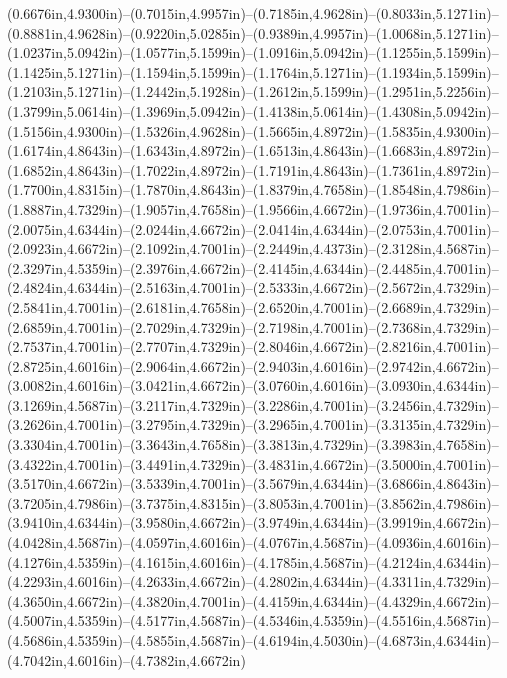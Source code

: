 (0.6676in,4.9300in)--(0.7015in,4.9957in)--(0.7185in,4.9628in)--(0.8033in,5.1271in)--(0.8881in,4.9628in)--(0.9220in,5.0285in)--(0.9389in,4.9957in)--(1.0068in,5.1271in)--(1.0237in,5.0942in)--(1.0577in,5.1599in)--(1.0916in,5.0942in)--(1.1255in,5.1599in)--(1.1425in,5.1271in)--(1.1594in,5.1599in)--(1.1764in,5.1271in)--(1.1934in,5.1599in)--(1.2103in,5.1271in)--(1.2442in,5.1928in)--(1.2612in,5.1599in)--(1.2951in,5.2256in)--(1.3799in,5.0614in)--(1.3969in,5.0942in)--(1.4138in,5.0614in)--(1.4308in,5.0942in)--(1.5156in,4.9300in)--(1.5326in,4.9628in)--(1.5665in,4.8972in)--(1.5835in,4.9300in)--(1.6174in,4.8643in)--(1.6343in,4.8972in)--(1.6513in,4.8643in)--(1.6683in,4.8972in)--(1.6852in,4.8643in)--(1.7022in,4.8972in)--(1.7191in,4.8643in)--(1.7361in,4.8972in)--(1.7700in,4.8315in)--(1.7870in,4.8643in)--(1.8379in,4.7658in)--(1.8548in,4.7986in)--(1.8887in,4.7329in)--(1.9057in,4.7658in)--(1.9566in,4.6672in)--(1.9736in,4.7001in)--(2.0075in,4.6344in)--(2.0244in,4.6672in)--(2.0414in,4.6344in)--(2.0753in,4.7001in)--(2.0923in,4.6672in)--(2.1092in,4.7001in)--(2.2449in,4.4373in)--(2.3128in,4.5687in)--(2.3297in,4.5359in)--(2.3976in,4.6672in)--(2.4145in,4.6344in)--(2.4485in,4.7001in)--(2.4824in,4.6344in)--(2.5163in,4.7001in)--(2.5333in,4.6672in)--(2.5672in,4.7329in)--(2.5841in,4.7001in)--(2.6181in,4.7658in)--(2.6520in,4.7001in)--(2.6689in,4.7329in)--(2.6859in,4.7001in)--(2.7029in,4.7329in)--(2.7198in,4.7001in)--(2.7368in,4.7329in)--(2.7537in,4.7001in)--(2.7707in,4.7329in)--(2.8046in,4.6672in)--(2.8216in,4.7001in)--(2.8725in,4.6016in)--(2.9064in,4.6672in)--(2.9403in,4.6016in)--(2.9742in,4.6672in)--(3.0082in,4.6016in)--(3.0421in,4.6672in)--(3.0760in,4.6016in)--(3.0930in,4.6344in)--(3.1269in,4.5687in)--(3.2117in,4.7329in)--(3.2286in,4.7001in)--(3.2456in,4.7329in)--(3.2626in,4.7001in)--(3.2795in,4.7329in)--(3.2965in,4.7001in)--(3.3135in,4.7329in)--(3.3304in,4.7001in)--(3.3643in,4.7658in)--(3.3813in,4.7329in)--(3.3983in,4.7658in)--(3.4322in,4.7001in)--(3.4491in,4.7329in)--(3.4831in,4.6672in)--(3.5000in,4.7001in)--(3.5170in,4.6672in)--(3.5339in,4.7001in)--(3.5679in,4.6344in)--(3.6866in,4.8643in)--(3.7205in,4.7986in)--(3.7375in,4.8315in)--(3.8053in,4.7001in)--(3.8562in,4.7986in)--(3.9410in,4.6344in)--(3.9580in,4.6672in)--(3.9749in,4.6344in)--(3.9919in,4.6672in)--(4.0428in,4.5687in)--(4.0597in,4.6016in)--(4.0767in,4.5687in)--(4.0936in,4.6016in)--(4.1276in,4.5359in)--(4.1615in,4.6016in)--(4.1785in,4.5687in)--(4.2124in,4.6344in)--(4.2293in,4.6016in)--(4.2633in,4.6672in)--(4.2802in,4.6344in)--(4.3311in,4.7329in)--(4.3650in,4.6672in)--(4.3820in,4.7001in)--(4.4159in,4.6344in)--(4.4329in,4.6672in)--(4.5007in,4.5359in)--(4.5177in,4.5687in)--(4.5346in,4.5359in)--(4.5516in,4.5687in)--(4.5686in,4.5359in)--(4.5855in,4.5687in)--(4.6194in,4.5030in)--(4.6873in,4.6344in)--(4.7042in,4.6016in)--(4.7382in,4.6672in)

